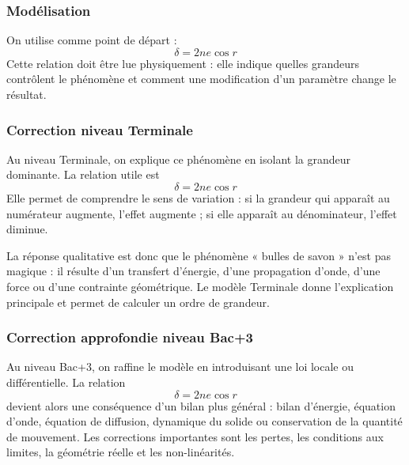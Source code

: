\documentclass[11pt,a4paper]{article}
\begin{document}
\subsubsection*{Modélisation}

\begin{theorembox}
On utilise comme point de départ :
\[
\delta=2ne\cos r
\]
Cette relation doit être lue physiquement : elle indique quelles grandeurs contrôlent le phénomène et comment une modification d'un paramètre change le résultat.
\end{theorembox}

\subsubsection*{Correction niveau Terminale}

\begin{corrigebox}

Au niveau Terminale, on explique ce phénomène en isolant la grandeur dominante. La relation utile est
\[
\delta=2ne\cos r
\]
Elle permet de comprendre le sens de variation : si la grandeur qui apparaît au numérateur augmente, l'effet augmente ; si elle apparaît au dénominateur, l'effet diminue.

La réponse qualitative est donc que le phénomène « bulles de savon » n'est pas magique : il résulte d'un transfert d'énergie, d'une propagation d'onde, d'une force ou d'une contrainte géométrique. Le modèle Terminale donne l'explication principale et permet de calculer un ordre de grandeur.

\end{corrigebox}

\subsubsection*{Correction approfondie niveau Bac+3}

\begin{approfondissementbox}

Au niveau Bac+3, on raffine le modèle en introduisant une loi locale ou différentielle. La relation
\[
\delta=2ne\cos r
\]
devient alors une conséquence d'un bilan plus général : bilan d'énergie, équation d'onde, équation de diffusion, dynamique du solide ou conservation de la quantité de mouvement. Les corrections importantes sont les pertes, les conditions aux limites, la géométrie réelle et les non-linéarités.

\end{approfondissementbox}
\end{document}
